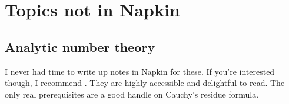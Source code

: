 \section{Topics not in Napkin}
\subsection{Analytic number theory}
I never had time to write up notes in Napkin for these.
If you're interested though, I recommend \cite{ref:analytic_NT}.
They are highly accessible and delightful to read.
The only real prerequisites are a good handle on Cauchy's residue formula.
